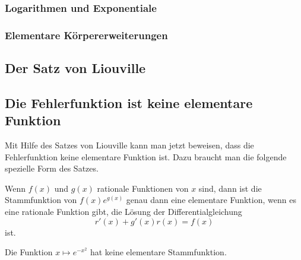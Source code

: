 \subsubsection{Logarithmen und Exponentiale}

\subsubsection{Elementare Körpererweiterungen}

\subsection{Der Satz von Liouville
\label{buch:integrale:section:liouville}}

\subsection{Die Fehlerfunktion ist keine elementare Funktion
\label{buch:integrale:section:fehlernichtelementar}}
Mit Hilfe des Satzes von Liouville kann man jetzt beweisen, dass 
die Fehlerfunktion keine elementare Funktion ist.
Dazu braucht man die folgende spezielle Form des Satzes.

\begin{satz}
\label{buch:integrale:satz:elementarestammfunktion}
Wenn $f(x)$ und $g(x)$ rationale Funktionen von $x$ sind, dann
ist die Stammfunktion von $f(x)e^{g(x)}$ genau dann eine 
elementare Funktion, wenn es eine rationale Funktion gibt, die
Lösung der Differentialgleichung
\[
r'(x) + g'(x)r(x)=f(x)
\]
ist.
\end{satz}

\begin{satz}
Die Funktion $x\mapsto e^{-x^2}$ hat keine elementare Stammfunktion.
\label{buch:iintegrale:satz:expx2}
\end{satz}

